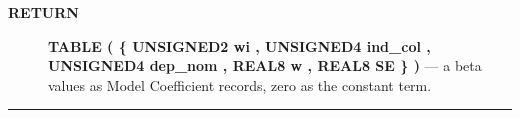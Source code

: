 \par
\begin{description}
\item [\colorbox{tagtype}{\color{white} \textbf{\textsf{RETURN}}}] \textbf{TABLE ( \{ UNSIGNED2 wi , UNSIGNED4 ind\_col , UNSIGNED4 dep\_nom , REAL8 w , REAL8 SE \} )} --- a beta values as Model Coefficient records, zero as the constant term.
\end{description}




\rule{\linewidth}{0.5pt}
